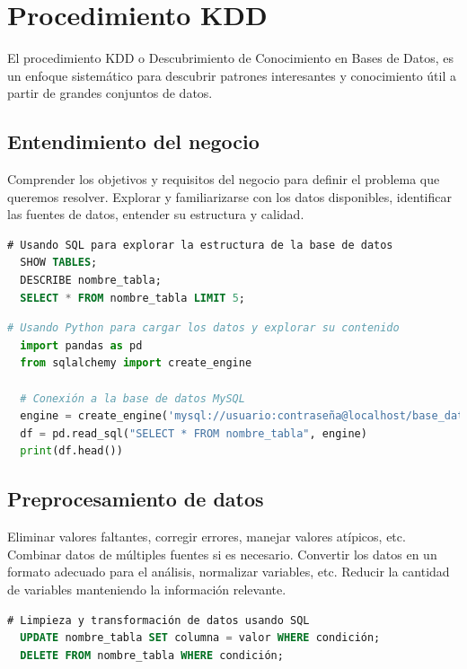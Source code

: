 \documentclass[12pt]{article}
\begin{document}
\section{Procedimiento KDD}

El procedimiento KDD o Descubrimiento de Conocimiento en Bases de Datos, es un enfoque sistemático para descubrir patrones interesantes y conocimiento útil a partir de grandes conjuntos de datos. 

\subsection{Entendimiento del negocio}

Comprender los objetivos y requisitos del negocio para definir el problema que queremos resolver. Explorar y familiarizarse con los datos disponibles, identificar las fuentes de datos, entender su estructura y calidad.

\begin{lstlisting}[language=SQL]
  # Usando SQL para explorar la estructura de la base de datos
  SHOW TABLES;
  DESCRIBE nombre_tabla;
  SELECT * FROM nombre_tabla LIMIT 5;
\end{lstlisting}
\vspace{12pt}


\begin{lstlisting}[language=Python]
  # Usando Python para cargar los datos y explorar su contenido
  import pandas as pd
  from sqlalchemy import create_engine

  # Conexión a la base de datos MySQL
  engine = create_engine('mysql://usuario:contraseña@localhost/base_datos')
  df = pd.read_sql("SELECT * FROM nombre_tabla", engine)
  print(df.head())
\end{lstlisting}


\subsection{Preprocesamiento de datos}

Eliminar valores faltantes, corregir errores, manejar valores atípicos, etc. Combinar datos de múltiples fuentes si es necesario. Convertir los datos en un formato adecuado para el análisis, normalizar variables, etc. Reducir la cantidad de variables manteniendo la información relevante.

\begin{lstlisting}[language=SQL]
  # Limpieza y transformación de datos usando SQL
  UPDATE nombre_tabla SET columna = valor WHERE condición;
  DELETE FROM nombre_tabla WHERE condición;
\end{lstlisting}
\vspace{12pt}
\end{document}
